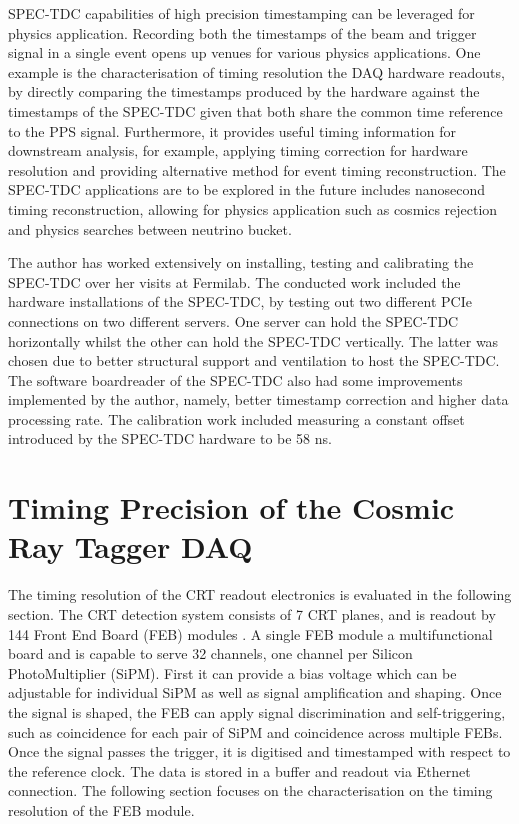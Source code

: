 SPEC-TDC capabilities of high precision timestamping can be leveraged for physics application.
Recording both the timestamps of the beam and trigger signal in a single event opens up venues for various physics applications. 
One example is the characterisation of timing resolution the DAQ hardware readouts, by directly comparing the timestamps produced by the hardware against the timestamps of the SPEC-TDC given that both share the common time reference to the PPS signal.
Furthermore, it provides useful timing information for downstream analysis, for example, applying timing correction for hardware resolution and providing alternative method for event timing reconstruction. 
The SPEC-TDC applications are to be explored in the future includes nanosecond timing reconstruction, allowing for physics application such as cosmics rejection and physics searches between neutrino bucket.

The author has worked extensively on installing, testing and calibrating the SPEC-TDC over her visits at Fermilab.
The  conducted work included the hardware installations of the SPEC-TDC, by testing out two different PCIe connections on two different servers. 
One server can hold the SPEC-TDC horizontally whilst the other can hold the SPEC-TDC vertically. 
The latter was chosen due to better structural support and ventilation to host the SPEC-TDC.
The software boardreader of the SPEC-TDC also had some improvements implemented by the author, namely, better timestamp correction and higher data processing rate.
The calibration work included measuring a constant offset introduced by the SPEC-TDC hardware to be 58 ns.

\section{Timing Precision of the Cosmic Ray Tagger DAQ}
\label{sec4InternalClock}

The timing resolution of the CRT readout electronics is evaluated in the following section.
The CRT detection system consists of 7 CRT planes, and is readout by 144 Front End Board (FEB) modules \cite{crt_note}. 
A single FEB module a multifunctional board and is capable to serve 32 channels, one channel per Silicon PhotoMultiplier (SiPM). 
First it can provide a bias voltage which can be adjustable for individual SiPM as well as signal amplification and shaping.
Once the signal is shaped, the FEB can apply signal discrimination and self-triggering, such as coincidence for each pair of SiPM and coincidence across multiple FEBs.
Once the signal passes the trigger, it is digitised and timestamped with respect to the reference clock.
The data is stored in a buffer and readout via Ethernet connection.
The following section focuses on the characterisation on the timing resolution of the FEB module.

